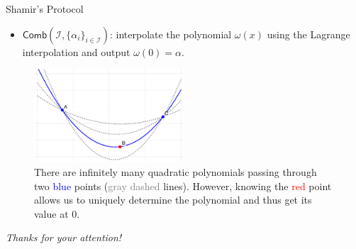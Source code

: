 \documentclass{beamer}
\begin{document}
    \begin{frame}{Shamir's Protocol}
      \begin{definition}
        \begin{itemize}
            \item $\mathsf{Comb}(\mathcal{I}, \{\alpha_i\}_{i \in \mathcal{I}})$: interpolate the polynomial $\omega(x)$ using the Lagrange interpolation and output $\omega(0) = \alpha$.
        \end{itemize}
      \end{definition}

      \begin{figure}
        \centering
        \includegraphics[width=0.5\textwidth]{images/lecture_1/shamir_demo.pdf}
        \caption{There are infinitely many quadratic polynomials passing through two \textcolor{blue}{blue} points (\textcolor{gray}{gray dashed} lines). However, knowing the \textcolor{red}{red} point allows us to uniquely determine the polynomial and thus get its value at $0$.}
        \label{fig:shamir}
      \end{figure}
    \end{frame}
  
    \begin{frame}{}
        \centering \Large
        \emph{Thanks for your attention!}
      \end{frame}
\end{document}
